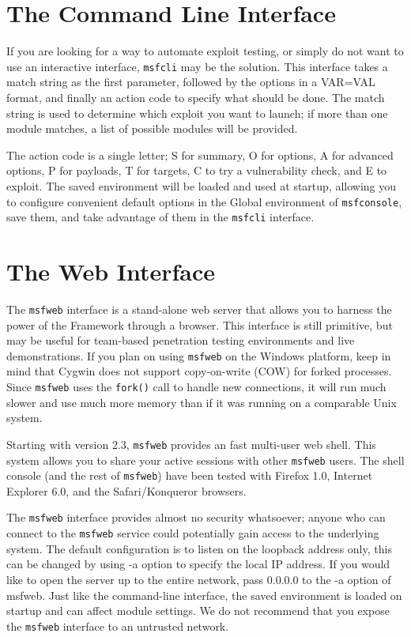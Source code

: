 \documentclass{report}
\begin{document}
    \section{The Command Line Interface}
    \label{STARTED-CLI}
\par
If you are looking for a way to automate exploit testing, or simply do not want
to use an interactive interface, \texttt{msfcli} may be the solution. This
interface takes a match string as the first parameter, followed by the options
in a VAR=VAL format, and finally an action code to specify what should be done.
The match string is used to determine which exploit you want to launch; if more
than one module matches, a list of possible modules will be provided. 

\par
The action code is a single letter; S for summary, O for options, A for advanced
options, P for payloads, T for targets, C to try a vulnerability check, and E to
exploit. The saved environment will be loaded and used at startup, allowing you
to configure convenient default options in the Global environment of
\texttt{msfconsole}, save them, and take advantage of them in the
\texttt{msfcli} interface. 


    \section{The Web Interface}
    \label{STARTED-WEB}
\par
The \texttt{msfweb} interface is a stand-alone web server that allows
you to harness the power of the Framework through a browser. This interface 
is still primitive, but may be useful for team-based penetration testing
environments and live demonstrations. If you plan on using \texttt{msfweb} on
the Windows platform, keep in mind that Cygwin does not support copy-on-write
(COW) for forked processes. Since \texttt{msfweb} uses the \texttt{fork()} call
to handle new connections, it will run much slower and use much more memory than
if it was running on a comparable Unix system.

\par
Starting with version 2.3, \texttt{msfweb} provides an fast multi-user web shell. This 
system allows you to share your active sessions with other \texttt{msfweb} users. The
shell console (and the rest of \texttt{msfweb}) have been tested with Firefox
1.0, Internet Explorer 6.0, and the Safari/Konqueror browsers. 

\par
The \texttt{msfweb} interface provides almost no security whatsoever; anyone who can connect 
to the \texttt{msfweb} service could potentially gain access to the underlying system. 
The default configuration is to listen on the loopback address only, this can be
changed by using -a option to specify the local IP address. If you would like to open the
server up to the entire network, pass 0.0.0.0 to the -a option of msfweb. Just like the 
command-line interface, the saved environment is loaded on startup and can affect module 
settings. We do not recommend that you expose the \texttt{msfweb} interface to
an untrusted network. 
\end{document}
